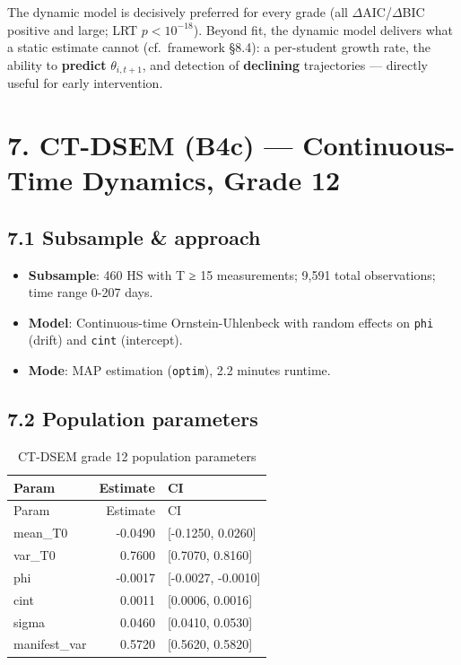 \documentclass[
]{article}
\providecommand{\tightlist}{%
  \setlength{\itemsep}{0pt}\setlength{\parskip}{0pt}}
\begin{document}
The dynamic model is decisively preferred for every grade (all
\(\Delta\)AIC/\(\Delta\)BIC positive and large; LRT \(p < 10^{-18}\)).
Beyond fit, the dynamic model delivers what a static estimate cannot
(cf.~framework §8.4): a per-student growth rate, the ability to
\textbf{predict} \(\theta_{i,t+1}\), and detection of \textbf{declining}
trajectories --- directly useful for early intervention.

\hypertarget{ct-dsem-b4c-continuous-time-dynamics-grade-12}{%
\section{7. CT-DSEM (B4c) --- Continuous-Time Dynamics, Grade
12}\label{ct-dsem-b4c-continuous-time-dynamics-grade-12}}

\hypertarget{subsample-approach}{%
\subsection{7.1 Subsample \& approach}\label{subsample-approach}}

\begin{itemize}
\tightlist
\item
  \textbf{Subsample}: 460 HS with T ≥ 15 measurements; 9,591 total
  observations; time range 0-207 days.
\item
  \textbf{Model}: Continuous-time Ornstein-Uhlenbeck with random effects
  on \texttt{phi} (drift) and \texttt{cint} (intercept).
\item
  \textbf{Mode}: MAP estimation (\texttt{optim}), 2.2 minutes runtime.
\end{itemize}

\hypertarget{population-parameters}{%
\subsection{7.2 Population parameters}\label{population-parameters}}

\begin{longtable}[]{@{}lrl@{}}
\caption{CT-DSEM grade 12 population parameters}\tabularnewline
\toprule
Param & Estimate & CI \\
\midrule
\endfirsthead
\toprule
Param & Estimate & CI \\
\midrule
\endhead
mean\_T0 & -0.0490 & {[}-0.1250, 0.0260{]} \\
var\_T0 & 0.7600 & {[}0.7070, 0.8160{]} \\
phi & -0.0017 & {[}-0.0027, -0.0010{]} \\
cint & 0.0011 & {[}0.0006, 0.0016{]} \\
sigma & 0.0460 & {[}0.0410, 0.0530{]} \\
manifest\_var & 0.5720 & {[}0.5620, 0.5820{]} \\
\bottomrule
\end{longtable}
\end{document}
